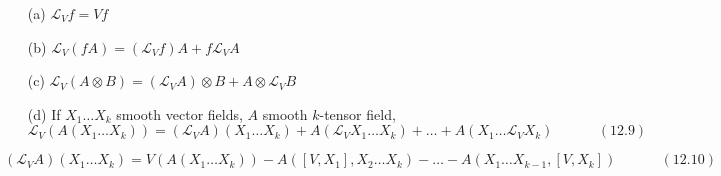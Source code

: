 \hrulefill


\begin{proposition}[12.32]
  \begin{enumerate}
\item[(a)] $\mathcal{L}_V f = Vf$ 
\item[(b)] $\mathcal{L}_V(fA) = (\mathcal{L}_Vf )A + f\mathcal{L}_VA$
\item[(c)] $\mathcal{L}_V(A\otimes B) = (\mathcal{L}_VA) \otimes B + A \otimes \mathcal{L}_V B$ 
\item[(d)] If $X_1 \dots X_k$ smooth vector fields, $A$ smooth $k$-tensor field, 
\begin{equation}
  \mathcal{L}_V(A(X_1 \dots X_k)) = (\mathcal{L}_VA)(X_1 \dots X_k) + A(\mathcal{L}_VX_1 \dots X_k) + \dots + A(X_1 \dots \mathcal{L}_VX_k) \quad \quad \quad \, (12.9)
\end{equation}
\end{enumerate}

\end{proposition}

\begin{corollary}[12.33]
\begin{equation}
  (\mathcal{L}_VA)(X_1 \dots X_k) = V(A(X_1 \dots X_k))  - A([V,X_1], X_2 \dots X_k) - \dots - A(X_1 \dots X_{k-1}, [V,X_k]) \quad \quad \quad \, (12.10)
\end{equation}
\end{corollary}




